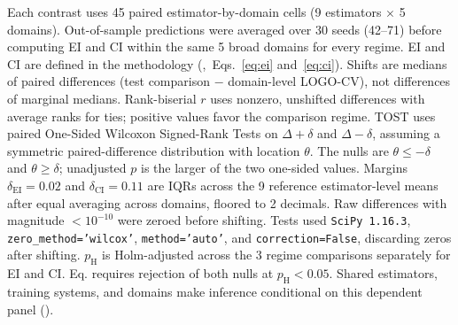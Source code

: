 \documentclass{article}
\begin{document}
\begin{table}[H]
\begin{minipage}{\linewidth}
Each contrast uses 45 paired estimator-by-domain cells (9 estimators $\times$ 5 domains). Out-of-sample predictions were averaged over 30 seeds (42--71) before computing EI and CI within the same 5 broad domains for every regime. EI and CI are defined in the methodology (,~Eqs.~\eqref{eq:ei} and~\eqref{eq:ci}). Shifts are medians of paired differences (test comparison $-$ domain-level LOGO-CV), not differences of marginal medians. Rank-biserial $r$ uses nonzero, unshifted differences with average ranks for ties; positive values favor the comparison regime. TOST uses paired One-Sided Wilcoxon Signed-Rank Tests on $\Delta+\delta$ and $\Delta-\delta$, assuming a symmetric paired-difference distribution with location $\theta$. The nulls are $\theta\leq-\delta$ and $\theta\geq\delta$; unadjusted $p$ is the larger of the two one-sided values. Margins $\delta_{\mathrm{EI}} = 0.02$ and $\delta_{\mathrm{CI}} = 0.11$ are IQRs across the 9 reference estimator-level means after equal averaging across domains, floored to 2 decimals. Raw differences with magnitude $<10^{-10}$ were zeroed before shifting. Tests used \texttt{SciPy 1.16.3}, \texttt{zero\_method='wilcox'}, \texttt{method='auto'}, and \texttt{correction=False}, discarding zeros after shifting. $p_{\mathrm H}$ is Holm-adjusted across the 3 regime comparisons separately for EI and CI. Eq. requires rejection of both nulls at $p_{\mathrm H}<0.05$. Shared estimators, training systems, and domains make inference conditional on this dependent panel ().
\end{minipage}
\end{table}
\end{document}
